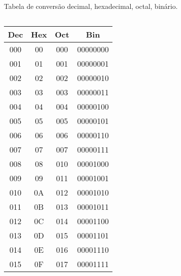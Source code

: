 \begin{frame}{Tabela de conversão decimal, hexadecimal, octal, binário.}
\small

\begin{columns}
  \begin{column}{.5\textwidth}
    
    \begin{tabular}{cccc}\hline
      \bf Dec& 	\bf Hex& 	\bf Oct &	\bf Bin \\\hline
      000&	00&	000&	00000000\\
      001&	01&	001&	00000001\\
      002&	02&	002&	00000010\\
      003&	03&	003&	00000011\\
      004&	04&	004&	00000100\\
      005&	05&	005&	00000101\\
      006&	06&	006&	00000110\\
      007&	07&	007&	00000111\\
      008&	08&	010&	00001000\\
      009&	09&	011&	00001001\\
      010&	0A&	012&	00001010\\
      011&	0B&	013&	00001011\\
      012&	0C&	014&	00001100\\
      013&	0D&	015&	00001101\\
      014&	0E&	016&	00001110\\
      015&	0F&	017&	00001111\\\hline
    \end{tabular}

  \end{column}


\end{columns}
\end{frame}
